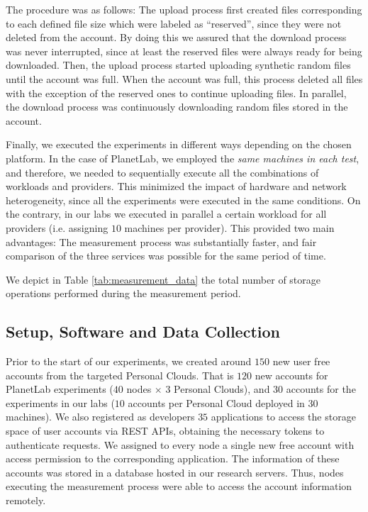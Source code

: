 The procedure was as follows: The upload process first
created files corresponding to each defined file size which
were labeled as ``reserved'', since they were not deleted from the account.
By doing this we assured that the download process was never interrupted,
since at least the reserved files were always ready for being downloaded.
Then, the upload process started uploading synthetic 
random files until the account was full. When the account was full,
this process deleted all files with the exception of the reserved ones
to continue uploading files.
In parallel, the download process was continuously downloading random files
stored in the account. 
 
Finally, we executed the experiments
in different ways depending on the chosen platform. In the case of
PlanetLab, we employed the \textit{same machines in each test}, and therefore, 
we needed to sequentially execute all the combinations of workloads and providers. 
This minimized the impact of hardware and network
heterogeneity, since all the experiments were executed in the same conditions.
On the contrary, in our labs we executed in parallel a certain workload
for all providers (i.e. assigning $10$ machines per provider).
This provided two main advantages: The measurement process was
substantially faster, and fair comparison of the three services
was possible for the same period of time. 
 
We depict in Table \ref{tab:measurement_data} the total 
number of storage operations performed during the measurement period.

\subsection{Setup, Software and Data Collection}

Prior to the start of our experiments, we created 
around $150$ new user free accounts from the targeted Personal Clouds.
That is $120$ new accounts for PlanetLab experiments ($40$ nodes
$\times$ $3$ Personal Clouds), and $30$ accounts for the experiments
in our labs ($10$ accounts per Personal Cloud deployed in $30$ machines). 
We also registered as developers $35$ applications to access the storage
space of user accounts via REST APIs, obtaining the necessary tokens
to authenticate requests.
We assigned to every node a single new free account with access permission
to the corresponding application.
The information of these accounts was stored in a database hosted in our research servers.
Thus, nodes executing the measurement process were able to access the
account information remotely. 

